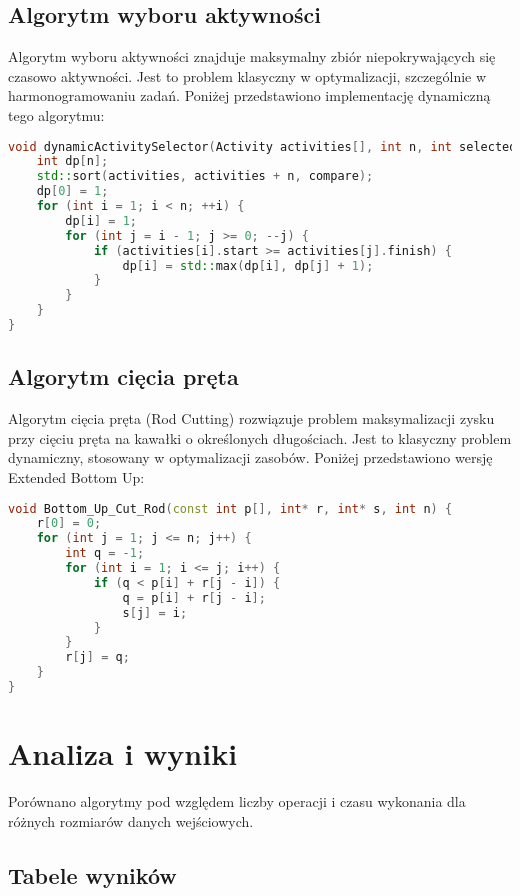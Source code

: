 \documentclass[a4paper,12pt]{article}
\begin{document}
\subsection{Algorytm wyboru aktywności}
Algorytm wyboru aktywności znajduje maksymalny zbiór niepokrywających się czasowo aktywności. Jest to problem klasyczny w optymalizacji, szczególnie w harmonogramowaniu zadań. Poniżej przedstawiono implementację dynamiczną tego algorytmu:
\begin{lstlisting}[language=C++]
void dynamicActivitySelector(Activity activities[], int n, int selected[], int& selectedCount) {
    int dp[n];
    std::sort(activities, activities + n, compare);
    dp[0] = 1;
    for (int i = 1; i < n; ++i) {
        dp[i] = 1;
        for (int j = i - 1; j >= 0; --j) {
            if (activities[i].start >= activities[j].finish) {
                dp[i] = std::max(dp[i], dp[j] + 1);
            }
        }
    }
}
\end{lstlisting}

\newpage
\subsection{Algorytm cięcia pręta}
Algorytm cięcia pręta (Rod Cutting) rozwiązuje problem maksymalizacji zysku przy cięciu pręta na kawałki o określonych długościach. Jest to klasyczny problem dynamiczny, stosowany w optymalizacji zasobów. Poniżej przedstawiono wersję Extended Bottom Up:
\begin{lstlisting}[language=C++]
void Bottom_Up_Cut_Rod(const int p[], int* r, int* s, int n) {
    r[0] = 0;
    for (int j = 1; j <= n; j++) {
        int q = -1;
        for (int i = 1; i <= j; i++) {
            if (q < p[i] + r[j - i]) {
                q = p[i] + r[j - i];
                s[j] = i;
            }
        }
        r[j] = q;
    }
}
\end{lstlisting}

\newpage
\section{Analiza i wyniki}
Porównano algorytmy pod względem liczby operacji i czasu wykonania dla różnych rozmiarów danych wejściowych.

\subsection{Tabele wyników}
\end{document}
